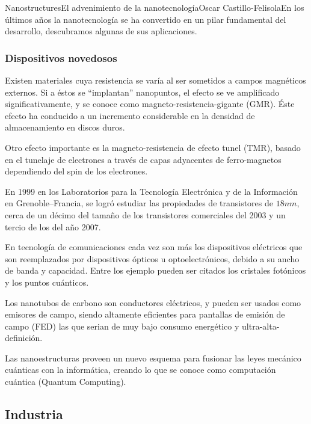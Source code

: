 \begin{article}{Nanostructures}{El advenimiento de la nanotecnolog\'ia}{Oscar Castillo-Felisola}{En los \'ultimos a\~nos la nanotecnolog\'ia se ha convertido en un pilar fundamental del desarrollo, descubramos algunas de sus aplicaciones.}
\subsubsection*{Dispositivos novedosos}

Existen materiales cuya resistencia se var\'ia  al ser sometidos a campos magn\'eticos externos. Si a \'estos se ``implantan'' nanopuntos, el efecto se ve amplificado significativamente, y se conoce como magneto-resistencia-gigante (GMR). \'Este efecto ha conducido a un incremento considerable en la densidad de almacenamiento en discos duros.

Otro efecto importante es la magneto-resistencia de efecto tunel (TMR), basado en el tunelaje de electrones a trav\'es de capas adyacentes  de ferro-magnetos dependiendo del spin de los electrones.

En 1999 en los Laboratorios para la Tecnolog\'ia Electr\'onica y de la Informaci\'on en Grenoble--Francia, se logr\'o estudiar las propiedades de transistores de $18 nm$, cerca de un d\'ecimo del tama\~no de los transistores comerciales del 2003 y un tercio de los del a\~no 2007.

En tecnolog\'ia de comunicaciones cada vez son m\'as los dispositivos el\'ectricos que son reemplazados por dispositivos \'opticos u optoelectr\'onicos, debido a su ancho de banda y capacidad. Entre los ejemplo pueden ser citados los cristales fot\'onicos y los puntos cu\'anticos.

Los nanotubos de carbono son conductores el\'ectricos, y pueden ser usados como emisores de campo,%
 siendo altamente eficientes para pantallas de emisi\'on de campo (FED) las que serian de muy bajo consumo energ\'etico y ultra-alta-definici\'on.

Las nanoestructuras proveen un nuevo esquema para fusionar las leyes mec\'anico cu\'anticas con la inform\'atica, creando lo que se conoce como computaci\'on cu\'antica (Quantum Computing).


\subsection{Industria}


\end{article}
